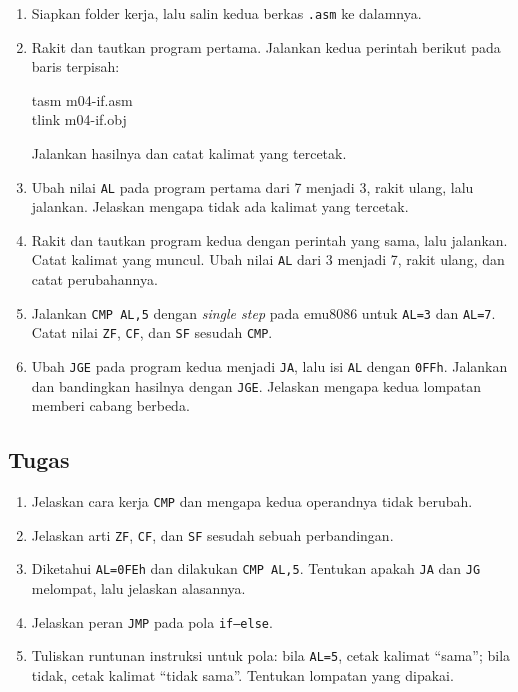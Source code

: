 \begin{enumerate}
    \item Siapkan folder kerja, lalu salin kedua berkas \texttt{.asm}
          ke dalamnya.
    \item Rakit dan tautkan program pertama. Jalankan kedua perintah
          berikut pada baris terpisah:
          \begin{perintah}
tasm m04-if.asm\\
tlink m04-if.obj
\end{perintah}
          Jalankan hasilnya dan catat kalimat yang tercetak.
    \item Ubah nilai \texttt{AL} pada program pertama dari 7 menjadi
          3, rakit ulang, lalu jalankan. Jelaskan mengapa tidak ada
          kalimat yang tercetak.
    \item Rakit dan tautkan program kedua dengan perintah yang sama,
          lalu jalankan. Catat kalimat yang muncul. Ubah nilai
          \texttt{AL} dari 3 menjadi 7, rakit ulang, dan catat
          perubahannya.
    \item Jalankan \texttt{CMP AL,5} dengan \emph{single step} pada
          emu8086 untuk \texttt{AL=3} dan \texttt{AL=7}. Catat nilai
          \texttt{ZF}, \texttt{CF}, dan \texttt{SF} sesudah
          \texttt{CMP}.
    \item Ubah \texttt{JGE} pada program kedua menjadi \texttt{JA},
          lalu isi \texttt{AL} dengan \texttt{0FFh}. Jalankan dan
          bandingkan hasilnya dengan \texttt{JGE}. Jelaskan mengapa
          kedua lompatan memberi cabang berbeda.
\end{enumerate}

\subsection{Tugas}

\begin{enumerate}
    \item Jelaskan cara kerja \texttt{CMP} dan mengapa kedua
          operandnya tidak berubah.
    \item Jelaskan arti \texttt{ZF}, \texttt{CF}, dan \texttt{SF}
          sesudah sebuah perbandingan.
    \item Diketahui \texttt{AL=0FEh} dan dilakukan
          \texttt{CMP AL,5}. Tentukan apakah \texttt{JA} dan
          \texttt{JG} melompat, lalu jelaskan alasannya.
    \item Jelaskan peran \texttt{JMP} pada pola \texttt{if--else}.
    \item Tuliskan runtunan instruksi untuk pola: bila
          \texttt{AL=5}, cetak kalimat ``sama''; bila tidak, cetak
          kalimat ``tidak sama''. Tentukan lompatan yang dipakai.
\end{enumerate}

